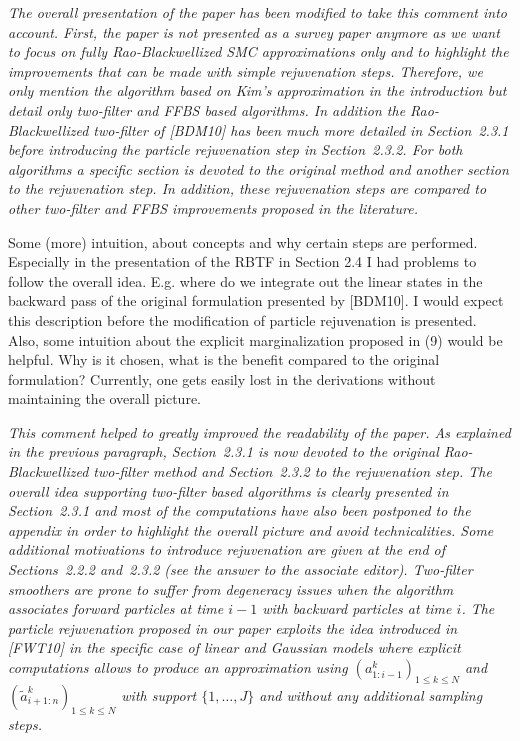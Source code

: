 \vspace{.2cm}

{\em
\noindent The overall presentation of the paper has been modified to take this comment into account. First, the paper is not presented as a survey paper anymore as we want to focus on fully Rao-Blackwellized SMC approximations only and to highlight the improvements that can be made with simple rejuvenation steps. Therefore, we only mention the algorithm based on Kim's approximation in the introduction but detail only two-filter and FFBS based algorithms. In addition the Rao-Blackwellized two-filter of [BDM10] has been much more detailed in Section~2.3.1 before introducing the particle rejuvenation step in Section~2.3.2. For both algorithms a specific section is devoted to the original method and another section to the rejuvenation step. In addition, these rejuvenation steps are compared to other two-filter and FFBS improvements proposed in the literature.
}

\vspace{.5cm}

\noindent Some (more) intuition, about concepts and why certain steps are performed. Especially in the presentation of the RBTF in Section 2.4 I had problems to follow the overall idea. E.g. where do we integrate out the linear states in the backward pass of the original formulation presented by [BDM10]. I would expect this description before the modification of particle rejuvenation is presented. Also, some intuition about the explicit marginalization proposed in (9) would be helpful. Why is it chosen, what is the benefit compared to the original formulation? Currently, one gets easily lost in the derivations without maintaining the overall picture. 

\vspace{.2cm}

{\em
\noindent  This comment helped to greatly improved the readability of the paper. As explained in the previous paragraph, Section~2.3.1 is now devoted to the original Rao-Blackwellized two-filter method and Section~2.3.2 to the rejuvenation step. The overall idea supporting two-filter based algorithms is clearly presented in Section~2.3.1 and most of the computations have also been postponed to the appendix in order to highlight the overall picture and avoid technicalities. Some additional motivations to introduce rejuvenation are given at the end of Sections~2.2.2 and~2.3.2 (see the answer to the associate editor). Two-filter smoothers are prone to suffer from degeneracy issues when the algorithm associates forward particles at time $i-1$ with backward particles at time $i$. The particle rejuvenation proposed in our paper exploits the idea introduced in [FWT10] in the specific case of linear and Gaussian models where explicit computations allows to produce an approximation using $(a^k_{1:i-1})_{1\le k \le N}$ and $(\tilde{a}^k_{i+1:n})_{1\le k \le N}$ with support $\{1,\ldots,J\}$ and without any additional sampling steps.
}


